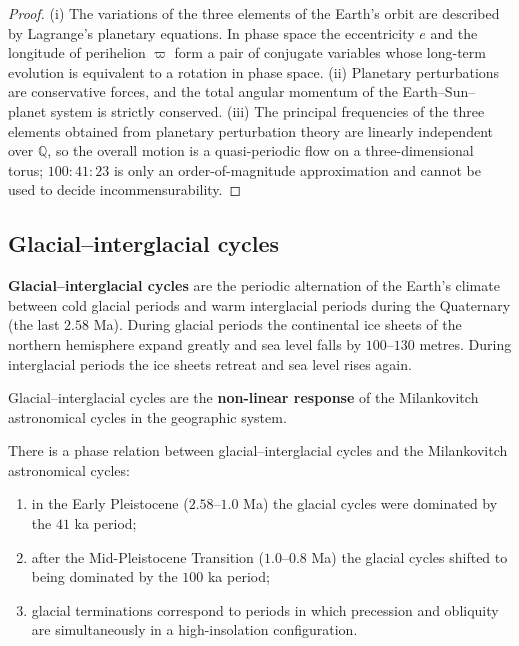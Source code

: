 \begin{proof}
(i) The variations of the three elements of the Earth's orbit are described by Lagrange's planetary equations. In phase space the eccentricity $e$ and the longitude of perihelion $\varpi$ form a pair of conjugate variables whose long-term evolution is equivalent to a rotation in phase space.
(ii) Planetary perturbations are conservative forces, and the total angular momentum of the Earth--Sun--planet system is strictly conserved.
(iii) The principal frequencies of the three elements obtained from planetary perturbation theory are linearly independent over $\mathbb{Q}$, so the overall motion is a quasi-periodic flow on a three-dimensional torus; $100:41:23$ is only an order-of-magnitude approximation and cannot be used to decide incommensurability.
\end{proof}

\subsection{Glacial--interglacial cycles}

\begin{definition}\label{def:glacial_interglacial_cycles}
\textbf{Glacial--interglacial cycles} are the periodic alternation of the Earth's climate between cold glacial periods and warm interglacial periods during the Quaternary (the last $2.58$ Ma). During glacial periods the continental ice sheets of the northern hemisphere expand greatly and sea level falls by $100$--$130$ metres. During interglacial periods the ice sheets retreat and sea level rises again.

Glacial--interglacial cycles are the \textbf{non-linear response} of the Milankovitch astronomical cycles in the geographic system.
\end{definition}

\begin{proposition}\label{prop:glacial_phase_locking}
There is a phase relation between glacial--interglacial cycles and the Milankovitch astronomical cycles:
\begin{enumerate}[label=(\roman*)]
    \item in the Early Pleistocene ($2.58$--$1.0$ Ma) the glacial cycles were dominated by the $41$ ka period;
    \item after the Mid-Pleistocene Transition ($1.0$--$0.8$ Ma) the glacial cycles shifted to being dominated by the $100$ ka period;
    \item glacial terminations correspond to periods in which precession and obliquity are simultaneously in a high-insolation configuration.
\end{enumerate}
\end{proposition}

